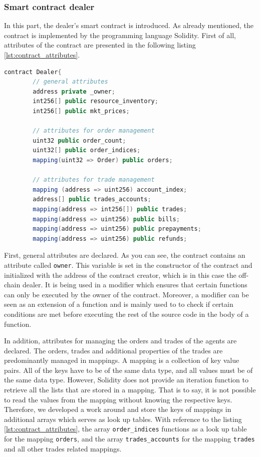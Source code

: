 \subsubsection{Smart contract dealer}
\label{sec:smart_contract_dealer}
In this part, the dealer's smart contract is introduced. 
As already mentioned, the contract is implemented by the programming language Solidity. 
First of all, attributes of the contract are presented in the following listing \ref{lst:contract_attributes}.

\begin{lstlisting}[float=htbp, label=lst:contract_attributes, caption=Attributes of Smart Contract, language=Java]
    contract Dealer{
        // general attributes
        address private _owner;
        int256[] public resource_inventory;
        int256[] public mkt_prices;

        // attributes for order management
        uint32 public order_count;
        uint32[] public order_indices;
        mapping(uint32 => Order) public orders;

        // attributes for trade management
        mapping (address => uint256) account_index; 
        address[] public trades_accounts;
        mapping(address => int256[]) public trades;
        mapping(address => uint256) public bills;
        mapping(address => uint256) public prepayments;
        mapping(address => uint256) public refunds;
\end{lstlisting}

First, general attributes are declared. As you can see, the contract contains an attribute called \verb|owner|.
This variable is set in the constructor of the contract and initialized with the address of the contract creator,
which is in this case the off-chain dealer.  
It is being used in a modifier which ensures that certain functions can only be executed by the owner of the contract.
Moreover, a modifier can be seen as an extension of a function and is mainly used to 
to check if certain conditions are met before executing the rest of the source code in the body of a function.

In addition, attributes for managing the orders and trades of the agents are declared. 
The orders, trades and additional properties of the trades are predominantly managed in mappings.
A mapping is a collection of key value pairs. All of the keys have to be of the same data type, and 
all values must be of the same data type. However, Solidity does not provide an iteration
function to retrieve all the lists that are stored in a mapping. 
That is to say, it is not possible to read the values from the mapping without knowing the respective keys.
Therefore, we developed a work around and store the keys of mappings in additional arrays which serves 
as look up tables.
With reference to the listing \ref{lst:contract_attributes}, the array \verb|order_indices| functions as a 
look up table for the mapping \verb|orders|, and the array \verb|trades_accounts| for the mapping 
\verb|trades| and all other trades related mappings.

